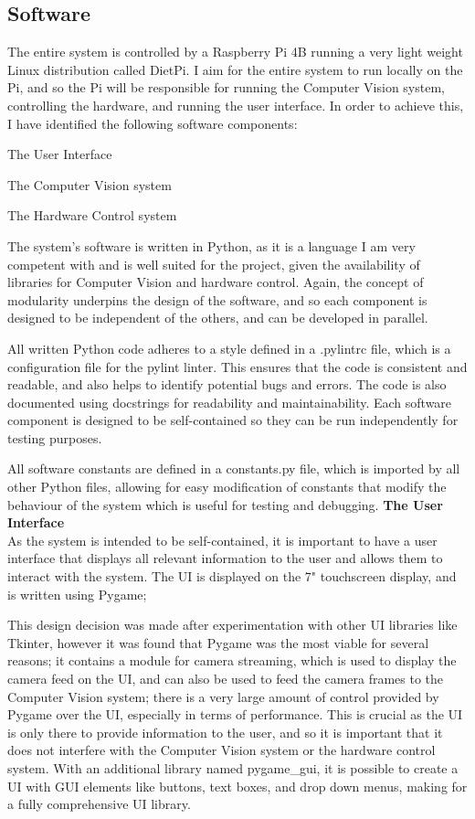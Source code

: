 \subsection{Software}
The entire system is controlled by a Raspberry Pi 4B running a very light weight Linux distribution called DietPi.
I aim for the entire system to run locally on the Pi, and so the Pi will be responsible for running the Computer Vision system,
controlling the hardware, and running the user interface. In order to achieve this, I have identified the following software components:
\begin{mylist}
  \item The User Interface
  \item The Computer Vision system
  \item The Hardware Control system
\end{mylist}
The system's software is written in Python\cite{python}, as it is a language I am very competent with and is well suited for the project, given the 
availability of libraries for Computer Vision and hardware control. Again, the concept of modularity underpins the design of the software,
and so each component is designed to be independent of the others, and can be developed in parallel.

All written Python code adheres to a style defined in a .pylintrc file, which is a configuration file for the pylint\cite{pylint} linter. This ensures
that the code is consistent and readable, and also helps to identify potential bugs and errors. The code is also documented using docstrings for 
readability and maintainability. Each software component is designed to be self-contained so they can be run independently for testing purposes.

All software constants are defined in a constants.py file, which is imported by all other Python files, allowing for easy modification of constants
that modify the behaviour of the system which is useful for testing and debugging.
\noindent
\textbf{The User Interface} \\
As the system is intended to be self-contained, it is important to have a user interface that displays all relevant information to the user
and allows them to interact with the system. The UI is displayed on the 7" touchscreen display, and is written using Pygame\cite{pygamedoc};

This design decision was made after experimentation with other UI libraries like Tkinter\cite{tkinterdoc}, however it was found that Pygame was the most
viable for several reasons; it contains a module for camera streaming, which is used to display the camera feed on the UI, and can also be used to
feed the camera frames to the Computer Vision system; there is a very large amount of control provided by Pygame over the UI, especially in terms of 
performance. This is crucial as the UI is only there to provide information to the user, and so it is important that it does not interfere with the
Computer Vision system or the hardware control system. With an additional library named pygame\_gui\cite{pygamegui}, it is possible to create a UI with 
GUI elements like buttons, text boxes, and drop down menus, making for a fully comprehensive UI library.

